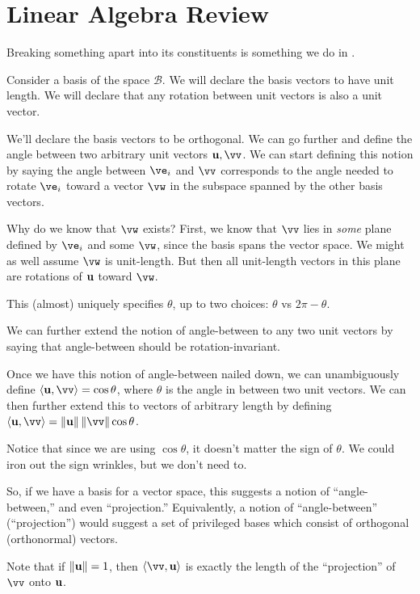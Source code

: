 \section{Linear Algebra Review}

Breaking something apart into its constituents is something we do in
.

Consider a basis of the space $\mathcal{B}$. We will declare the basis
vectors to have unit length. We will declare that any rotation between
unit vectors is also a unit vector.

We'll declare the basis vectors to be orthogonal. We can go further and
define the angle between two arbitrary unit vectors $\vu, \vv$. We can
start defining this notion by saying the angle between $\ve_i$ and $\vv$
corresponds to the angle needed to rotate $\ve_i$ toward a vector $\vw$
in the subspace spanned by the other basis vectors.

Why do we know that $\vw$ exists? First, we know that $\vv$ lies in
\emph{some} plane defined by $\ve_i$ and some $\vw$, since the basis
spans the vector space. We might as well assume $\vw$ is unit-length.
But then all unit-length vectors in this plane are rotations of $\bm{\mathrm{u}}$
toward $\vw$.

This (almost) uniquely specifies $\theta$, up to two choices: $\theta$
vs $2\pi - \theta$.

We can further extend the notion of angle-between to any two unit
vectors by saying that angle-between should be rotation-invariant.

Once we have this notion of angle-between nailed down, we can
unambiguously define $\innerprod{\vu}{\vv} = \cos\theta$, where $\theta$
is the angle in between two unit vectors. We can then further extend
this to vectors of arbitrary length by defining $\innerprod{\vu}{\vv} =
\norm{\vu} \norm{\vv} \cos\theta$.

Notice that since we are using $\cos\theta$, it doesn't matter the sign
of $\theta$. We could iron out the sign wrinkles, but we don't need to.

So, if we have a basis for a vector space, this suggests a notion of
``angle-between,'' and even ``projection.'' Equivalently, a notion of
``angle-between'' (``projection'') would suggest a set of privileged
bases which consist of orthogonal (orthonormal) vectors.

Note that if $\left\Vert \bm{\mathrm{u}} \right\Vert = 1$, then $\innerprod{\vv}{\vu}$ is exactly
the length of the ``projection'' of $\vv$ onto $\bm{\mathrm{u}}$.

